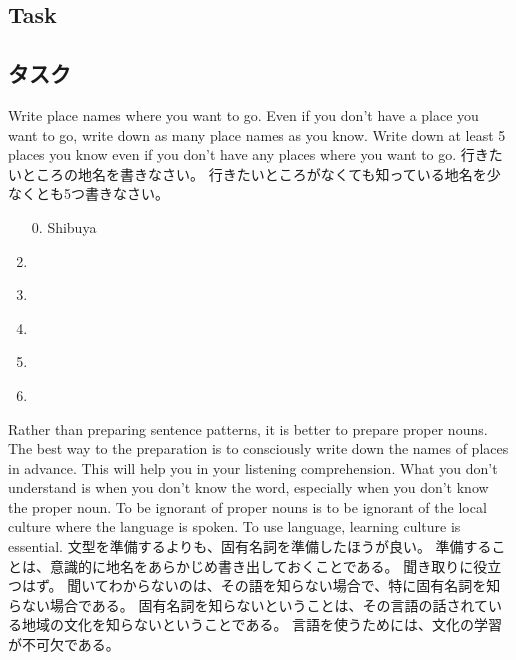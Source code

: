 \documentclass[uplatex,dvipdfmx,b5paper,english,10pt]{jsbook}
\begin{document}
\ifEnglish
\subsection{Task}
\else
\subsection{タスク}
\fi

\begin{toiquestion}
\ifEnglish
Write place names where you want to go.
Even if you don't have a place you want to go, write down as many place names as you know.
Write down at least 5 places you know even if you don't have any places where you want to go.
\else
行きたいところの地名を書きなさい。
行きたいところがなくても知っている地名を少なくとも5つ書きなさい。
\fi
\end{toiquestion}

\begin{enumerate}
  \item[0.] \underline{\hspace{1zw}}Shibuya\underline{\hspace{18.3zw}}
  \item \underline{\hspace{23zw}}
  \item \underline{\hspace{23zw}}
  \item \underline{\hspace{23zw}}
  \item \underline{\hspace{23zw}}
  \item \underline{\hspace{23zw}}
\end{enumerate}

\begin{toianswer}
\ifEnglish
Rather than preparing sentence patterns, it is better to prepare proper nouns.
The best way to the preparation is to consciously write down the names of places in advance.
This will help you in your listening comprehension.
What you don't understand is when you don't know the word, especially when you don't know the proper noun.
To be ignorant of proper nouns is to be ignorant of the local culture where the language is spoken.
To use language, learning culture is essential.
\else
文型を準備するよりも、固有名詞を準備したほうが良い。
準備することは、意識的に地名をあらかじめ書き出しておくことである。
聞き取りに役立つはず。
聞いてわからないのは、その語を知らない場合で、特に固有名詞を知らない場合である。
固有名詞を知らないということは、その言語の話されている地域の文化を知らないということである。
言語を使うためには、文化の学習が不可欠である。
\fi
\end{toianswer}
\end{document}
